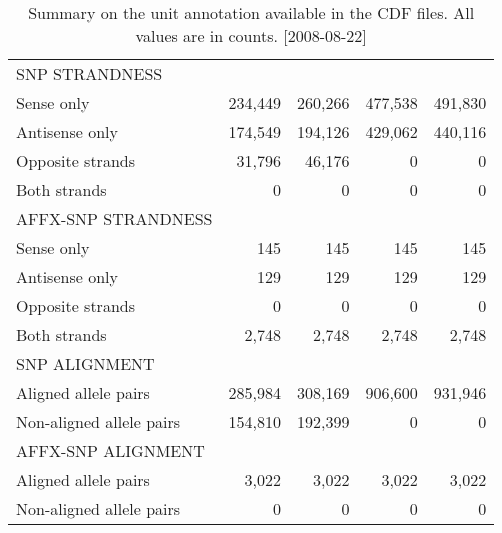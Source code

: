 \documentclass[11pt,a4paper]{article}
\begin{document}
\begin{table}
\begin{center}
\begin{tabular}{lrrrr}
\hline									            						             
SNP STRANDNESS					&	  				&	  				&	 				   &	 		     \\
Sense only              &  234,449  &  260,266  &   477,538 &    491,830 \\
Antisense only          &  174,549  &  194,126  &   429,062  &   440,116 \\
Opposite strands        &   31,796  &   46,176  &         0  &         0 \\
Both strands            &        0  &        0  &         0  &         0 \\
\hline									            						             
AFFX-SNP STRANDNESS 		&	  				&	  				&	 				   &	 		     \\
Sense only              &      145  &      145  &       145  &       145 \\
Antisense only          &      129  &      129  &       129  &       129 \\
Opposite strands        &        0  &        0  &         0  &         0 \\
Both strands            &    2,748  &    2,748  &     2,748  &     2,748 \\
\hline									            						             
SNP ALIGNMENT	           &	  			 &           &	 		      &	 		      \\
Aligned allele pairs     &  285,984  &  308,169  &   906,600  &   931,946 \\
Non-aligned allele pairs &  154,810  &  192,399  &         0  &         0 \\
\hline									            						             
AFFX-SNP ALIGNMENT	     &	  			 &	  				&	 		       &	 		      \\
Aligned allele pairs     &    3,022  &    3,022  &    3,022  &     3,022  \\
Non-aligned allele pairs &        0  &        0  &        0  &         0  \\
\hline									            						             
\end{tabular}
\end{center}
\caption{Summary on the unit annotation available in the CDF files.  All values are in counts. [2008-08-22]}
\label{tblCdfUnits}
\end{table}
\end{document}
